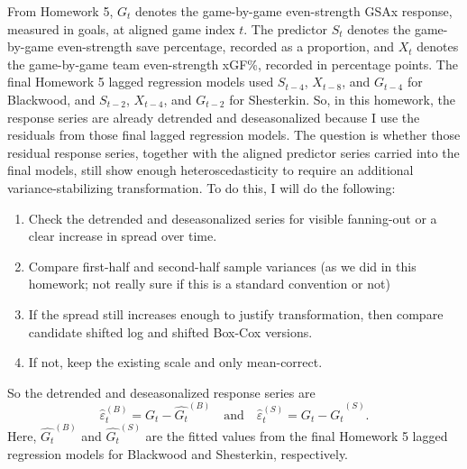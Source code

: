 \documentclass[
  10pt,
]{extarticle}
\providecommand{\tightlist}{%
  \setlength{\itemsep}{0pt}\setlength{\parskip}{0pt}}
\begin{document}
From Homework 5, \(G_t\) denotes the game-by-game even-strength GSAx response, measured in goals, at aligned game index \(t\). The predictor \(S_t\) denotes the game-by-game even-strength save percentage, recorded as a proportion, and \(X_t\) denotes the game-by-game team even-strength xGF\%, recorded in percentage points. The final Homework 5 lagged regression models used \(S_{t-4}\), \(X_{t-8}\), and \(G_{t-4}\) for Blackwood, and \(S_{t-2}\), \(X_{t-4}\), and \(G_{t-2}\) for Shesterkin. So, in this homework, the response series are already detrended and deseasonalized because I use the residuals from those final lagged regression models. The question is whether those residual response series, together with the aligned predictor series carried into the final models, still show enough heteroscedasticity to require an additional variance-stabilizing transformation. To do this, I will do the following:

\begin{enumerate}
\def\labelenumi{\arabic{enumi}.}
\tightlist
\item
  Check the detrended and deseasonalized series for visible fanning-out or a clear increase in spread over time.
\item
  Compare first-half and second-half sample variances (as we did in this homework; not really sure if this is a standard convention or not)
\item
  If the spread still increases enough to justify transformation, then compare candidate shifted log and shifted Box-Cox versions.
\item
  If not, keep the existing scale and only mean-correct.
\end{enumerate}

So the detrended and deseasonalized response series are
\[
\widehat{\varepsilon}^{(B)}_t = G_t - \widehat{G_t}^{(B)}
\quad \text{and} \quad
\widehat{\varepsilon}^{(S)}_t = G_t - \widehat{G_t}^{(S)}.
\]
Here, \(\widehat{G_t}^{(B)}\) and \(\widehat{G_t}^{(S)}\) are the fitted values from the final Homework 5 lagged regression models for Blackwood and Shesterkin, respectively.
\end{document}
